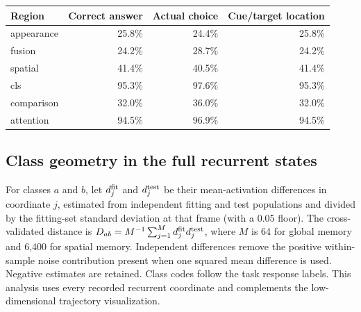\documentclass[11pt]{article}
\begin{document}
\begin{center}\small\begin{tabular}{lrrr}\toprule Region & Correct answer & Actual choice & Cue/target location\\\midrule
appearance & 25.8\% & 24.4\% & 25.8\%\\
fusion & 24.2\% & 28.7\% & 24.2\%\\
spatial & 41.4\% & 40.5\% & 41.4\%\\
cls & 95.3\% & 97.6\% & 95.3\%\\
comparison & 32.0\% & 36.0\% & 32.0\%\\
attention & 94.5\% & 96.9\% & 94.5\%\\
\bottomrule\end{tabular}\normalsize\end{center}
\subsection{Class geometry in the full recurrent states}
For classes $a$ and $b$, let $d^{\rm fit}_j$ and $d^{\rm test}_j$ be their mean-activation differences in coordinate $j$, estimated from independent fitting and test populations and divided by the fitting-set standard deviation at that frame (with a 0.05 floor). The cross-validated distance is $D_{ab}=M^{-1}\sum_{j=1}^{M}d^{\rm fit}_j d^{\rm test}_j$, where $M$ is 64 for global memory and 6,400 for spatial memory. Independent differences remove the positive within-sample noise contribution present when one squared mean difference is used. Negative estimates are retained. Class codes follow the task response labels. This analysis uses every recorded recurrent coordinate and complements the low-dimensional trajectory visualization.
\end{document}
